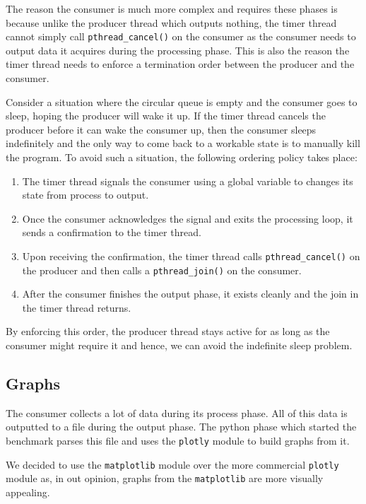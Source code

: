 \documentclass[10pt, author, twocolumn]{article}
\begin{document}
The reason the consumer is much more complex and requires these phases is because unlike the producer thread which outputs nothing, the timer thread cannot simply call \texttt{pthread\_cancel()} on the consumer as the consumer needs to output data it acquires during the processing phase. This is also the reason the timer thread needs to enforce a termination order between the producer and the consumer. 

Consider a situation where the circular queue is empty and the consumer goes to sleep, hoping the producer will wake it up. If the timer thread cancels the producer before it can wake the consumer up, then the consumer sleeps indefinitely and the only way to come back to a workable state is to manually kill the program. To avoid such a situation, the following ordering policy takes place:

\begin{enumerate}
    \item The timer thread signals the consumer using a global variable to changes its state from process to output. 
    \item Once the consumer acknowledges the signal and exits the processing loop, it sends a confirmation to the timer thread. 
    \item Upon receiving the confirmation, the timer thread calls \texttt{pthread\_cancel()} on the producer and then calls a \texttt{pthread\_join()} on the consumer.
    \item After the consumer finishes the output phase, it exists cleanly and the join in the timer thread returns. 
\end{enumerate}

By enforcing this order, the producer thread stays active for as long as the consumer might require it and hence, we can avoid the indefinite sleep problem. 

\subsection{Graphs}
The consumer collects a lot of data during its process phase. All of this data is outputted to a file during the output phase. The python phase which started the benchmark parses this file and uses the \texttt{plotly} module to build graphs from it.

We decided to use the \texttt{matplotlib} module over the more commercial \texttt{plotly} module as, in out opinion, graphs from the \texttt{matplotlib} are more visually appealing.
\end{document}
